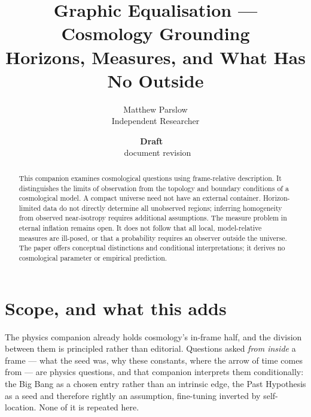 \documentclass[11pt,a4paper]{article}
\title{Graphic Equalisation --- Cosmology Grounding\\\large Horizons, Measures, and What Has No Outside}
\author{Matthew Parslow\\Independent Researcher}
\date{\textbf{Draft \texorpdfstring{\textemdash}{---}\ \PaperDraft}\\[2pt]\PaperDisplayDate \texorpdfstring{\textbullet}{\textperiodcentered}\ document revision \PaperRevision}
\theoremstyle{remark}\newtheorem{remark}[definition]{Remark}
\begin{document}
\maketitle
\begin{center}
\end{center}
\vspace{1em}

\begin{abstract}
This companion examines cosmological questions using frame-relative description.
It distinguishes the limits of observation from the topology and boundary
conditions of a cosmological model. A compact universe need not have an external
container. Horizon-limited data do not directly determine all unobserved regions;
inferring homogeneity from observed near-isotropy requires additional assumptions.
The measure problem in eternal inflation remains open. It does not follow that
all local, model-relative measures are ill-posed, or that a probability requires
an observer outside the universe. The paper offers conceptual distinctions and
conditional interpretations; it derives no cosmological parameter or empirical
prediction.
\end{abstract}

\section{Scope, and what this adds}\label{sec:scope}
The physics companion already holds cosmology's in-frame half, and the division between them is
principled rather than editorial. Questions asked \emph{from inside} a frame --- what the seed was, why
these constants, where the arrow of time comes from --- are physics questions, and that companion
interprets them conditionally: the Big Bang as a chosen entry rather than an intrinsic edge, the Past Hypothesis as a
seed and therefore rightly an assumption, fine-tuning inverted by self-location. None of it is
repeated here.
\end{document}
